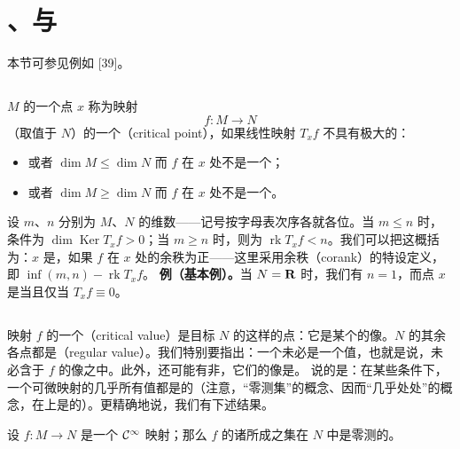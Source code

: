 
\section{\trCriticalPoint、\trCriticalValue{}与\trSardTheorem}
\label{sec:critical-points-sard}

本节可参见例如 [39]。

\subsection{\trCriticalPoint}
\label{subsec:critical-points}

\trManifold{} $M$ 的一个点 $x$ 称为映射
\[
f:M\longrightarrow N
\]
（取值于\trManifold{} $N$）的一个\textbf{\trCriticalPoint}（critical point），如果线性映射 $T_{x}f$ 不具有极大的\trRank：
\begin{itemize}
\item 或者 $\dim M\le\dim N$ 而 $f$ 在 $x$ 处不是一个\trImmersion；
\item 或者 $\dim M\ge\dim N$ 而 $f$ 在 $x$ 处不是一个\trSubmersion。
\end{itemize}

设 $m$、$n$ 分别为 $M$、$N$ 的维数——记号按字母表次序各就各位。当 $m\le n$ 时，条件为 $\dim\operatorname{Ker}T_{x}f>0$；当 $m\ge n$ 时，则为 $\operatorname{rk}T_{x}f<n$。我们可以把这概括为：$x$ 是\trCriticalPoint，如果 $f$ 在 $x$ 处的余秩为正——这里采用余秩（corank）的特设定义，即 $\inf(m,n)-\operatorname{rk}T_{x}f$。
\noindent\textbf{例（基本例）。}当 $N=\mathbf{R}$ 时，我们有 $n=1$，而点 $x$ 是\trCriticalPoint{}当且仅当 $T_{x}f\equiv 0$。

\subsection{\trSardTheorem}
\label{subsec:sard-theorem}

映射 $f$ 的一个\textbf{\trCriticalValue}（critical value）是目标\trManifold{} $N$ 的这样的点：它是某个\trCriticalPoint{}的像。$N$ 的其余各点都是\textbf{\trRegularValue}（regular value）。我们特别要指出：一个\trRegularValue{}未必是一个值，也就是说，未必含于 $f$ 的像之中。此外，还可能有非\trCriticalPoint，它们的像是\trCriticalValue。
\trSardTheorem{}说的是：在某些条件下，一个可微映射的几乎所有值都是\trRegular{}的（注意，“零测集”的概念、因而“几乎处处”的概念，在\trManifold{}上是\trWellDefined{}的）。更精确地说，我们有下述结果。

\begin{theorem}[\trSardTheorem]\label{thm:sard-theorem}
设 $f:M\to N$ 是一个 $\mathcal{C}^{\infty}$ 映射；那么 $f$ 的诸\trCriticalValue{}所成之集在 $N$ 中是零测的。
\end{theorem}

